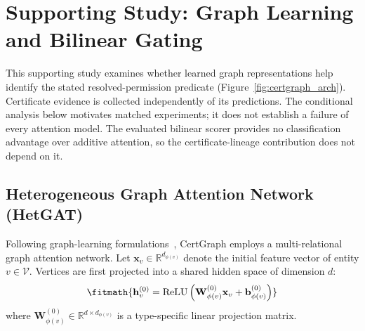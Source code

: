 \section{Supporting Study: Graph Learning and Bilinear Gating}
\label{sec:certgraph_arch}

This supporting study examines whether learned graph representations help identify the stated resolved-permission predicate (Figure~\ref{fig:certgraph_arch}). Certificate evidence is collected independently of its predictions. The conditional analysis below motivates matched experiments; it does not establish a failure of every attention model. The evaluated bilinear scorer provides no classification advantage over additive attention, so the certificate-lineage contribution does not depend on it.

\subsection{Heterogeneous Graph Attention Network (HetGAT)}
Following graph-learning formulations~\cite{scarselli2008graph,wu2021survey}, CertGraph employs a multi-relational graph attention network. Let $\mathbf{x}_v \in \mathbb{R}^{d_{\phi(v)}}$ denote the initial feature vector of entity $v \in \mathcal{V}$. Vertices are first projected into a shared hidden space of dimension $d$:
\begin{equation}
\fitmath{\mathbf{h}_v^{(0)} = \text{ReLU} \left( \mathbf{W}_{\phi(v)}^{(0)} \mathbf{x}_v + \mathbf{b}_{\phi(v)}^{(0)} \right)}
\end{equation}
where $\mathbf{W}_{\phi(v)}^{(0)} \in \mathbb{R}^{d \times d_{\phi(v)}}$ is a type-specific linear projection matrix.

